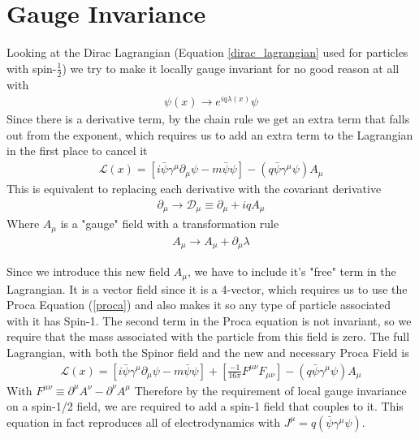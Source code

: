 \section{Gauge Invariance}\label{gauge-inv}
Looking at the Dirac Lagrangian (Equation \ref{dirac_lagrangian} used for particles with spin-$\frac{1}{2}$) we try to make it locally gauge invariant for no good reason at all\cite{griffiths_ep} with
\begin{align}
\psi(x) \rightarrow e^{iq\lambda(x)}\psi
\end{align}
Since there is a derivative term, by the chain rule we get an extra term that falls out from the exponent, which requires us to add an extra term to the Lagrangian in the first place to cancel it
\begin{align}
    \mathcal{L}(x) = [i\bar{\psi}\gamma^\mu\partial_\mu\psi - m\bar{\psi}\psi] - (q\bar{\psi}\gamma^\mu\psi)A_\mu
\end{align}
This is equivalent to replacing each derivative with the covariant derivative
\begin{align}
\partial_\mu \rightarrow \mathcal{D}_\mu \equiv \partial_\mu +iqA_\mu
\end{align}
Where $A_\mu$ is a "gauge" field with a transformation rule
\begin{align}\label{gauge-transform}
A_\mu \rightarrow A_\mu + \partial_\mu\lambda
\end{align}

Since we introduce this new field $A_\mu$, we have to include it's "free" term in the Lagrangian. It is a vector field since it is a 4-vector, which requires us to use the Proca Equation (\ref{proca}) and also makes it so any type of particle associated with it has Spin-1. The second term in the Proca equation is not invariant, so we require that the mass associated with the particle from this field is zero. The full Lagrangian, with both the Spinor field and the new and necessary Proca Field is
\begin{align}
\mathcal{L}(x) = [i\bar{\psi}\gamma^\mu\partial_\mu\psi - m\bar{\psi}\psi] + \left[\frac{-1}{16\pi}F^{\mu\nu}F_{\mu\nu}\right]- (q\bar{\psi}\gamma^\mu\psi)A_\mu
\end{align}
With $F^{\mu\nu}\equiv \partial^\mu A^\nu - \partial^\nu A^\mu$ Therefore by the requirement of local gauge invariance on a spin-1/2 field, we are required to add a spin-1 field that couples to it. This equation in fact reproduces all of electrodynamics with $J^\mu = q(\bar{\psi}\gamma^\mu\psi)$.

